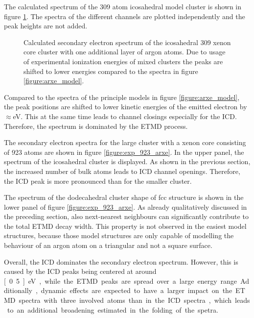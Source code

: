The calculated spectrum of the 309 atom icosahedral model cluster is
shown in figure \ref{figure:exp_309ico_arxe}. The spectra of the different
channels are plotted independently and the peak heights are not added.

\begin{figure}[t]
 \centering
 
 \caption{Calculated secondary electron spectrum of the icosahedral
          309 xenon core cluster with one additional layer of argon
          atoms. Due to usage of experimental ionization energies of
          mixed clusters the peaks are shifted to lower energies compared
          to the spectra in figure \ref{figure:arxe_model}.}
 \label{figure:exp_309ico_arxe}
\end{figure}

Compared to the spectra of the principle models in figure \ref{figure:arxe_model},
the peak positions are shifted to lower kinetic energies of the emitted
electron by $\approx$\unit[1]{eV}. This at the same time leads to
channel closings especially for
the \ac{ICD}. Therefore, the spectrum is dominated by the \ac{ETMD} process.


The secondary electron spectra for the large cluster with a xenon
core consisting of 923 atoms are shown in figure \ref{figure:exp_923_arxe}.
In the upper panel, the spectrum of the icosahedral cluster is displayed.
As shown in the previous section, the increased number of bulk atoms
leads to ICD channel openings. Therefore, the ICD peak is more pronounced
than for the smaller cluster.

The spectrum of the dodecahedral cluster shape of fcc structure is shown in
the lower panel of figure \ref{figure:exp_923_arxe}. As already qualitatively
discussed in the preceding section, also next-nearest neighbours can
significantly contribute to the total ETMD decay width. This property is
not observed in the easiest model structures,
because those model structures are only capable of modelling the behaviour of an
argon atom on a triangular and not a square surface.

Overall, the ICD dominates the secondary electron spectrum. However, this
is caused by the ICD peaks being centered at around \unit[0.5]{eV}, while
the ETMD peaks are spread over a large energy range. Additionally, dynamic
effects are expected to have a larger impact on the ETMD spectra with three
involved atoms than in the ICD spectra, which leads to an additional
broadening estimated in the folding of the spetra.




